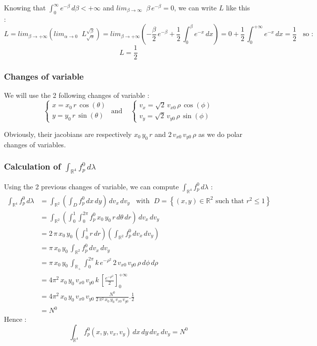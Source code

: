 \documentclass[10pt]{article}
\begin{document}
Knowing that $\int_{0}^{\infty} e^{-\beta}\,d\beta < +\infty$ and $lim_{\beta \to \infty} \;\;\beta\,e^{-\beta} = 0$, we can write $L$ like this :
$$L = lim_{\beta \to + \infty} \left(lim_{\alpha \to 0} \;\;L_{\sqrt{\alpha}}^{\sqrt{\beta}} \right)
= lim_{\beta \to + \infty} \left(-\frac{\beta}{2}\,e^{-\beta} + \frac{1}{2}\,\int_{0}^{\beta} e^{-x}\,dx \right)
= 0 +\frac{1}{2}\,\int_{0}^{+\infty} e^{-x}\,dx = \frac{1}{2} \;\; \mbox{ so :}$$
$$\boxed{L = \frac{1}{2}}$$

\subsubsection{Changes of variable}

We will use the 2 following changes of variable :
$$
\boxed{\left\lbrace
    \begin{array}{ll}
x = x_0\,r\,\cos(\theta) \\
y = y_0\,r\,\sin(\theta)
    \end{array}
\right. 
\mbox{ and } \;\;\;
\left\lbrace
    \begin{array}{ll}
v_x = \sqrt{2}\,v_{x0}\,\rho\,\cos(\phi) \\
v_y = \sqrt{2}\,v_{y0}\,\rho\,\sin(\phi)
    \end{array}
\right.
}
$$

Obviously, their jacobians are respectively $x_0\,y_0\,r$ and $2\,v_{x0}\,v_{y0}\,\rho$ as we do polar changes of variables.

\subsubsection{Calculation of $\int_{\mathbb{R}^4} f_p^0\,d\lambda$}

Using the 2 previous changes of variable, we can compute $\int_{\mathbb{R}^4} f_p^0\,d\lambda$ :
\begin{align*}
\int_{\mathbb{R}^4} f_p^0\,d\lambda &= \int_{\mathbb{R}^2} \left(\int_{D} f_p^0\,dx\,dy \right)\,dv_x\,dv_y \;\; \mbox{ with } \; D = \left\lbrace (x,y)\in\mathbb{R}^2 \mbox{ such that } r^2\leq 1 \right\rbrace \\
&= \int_{\mathbb{R}^2} \left(\int_0^1\int_0^{2\pi} f_p^0\,x_0\,y_0\,r\,d\theta\,dr \right)\,dv_x\,dv_y \\
&= 2\,\pi\,x_0\,y_0\,\left(\int_0^1 r\,dr\right) \left(
\int_{\mathbb{R}^2} f_p^0\,dv_x\,dv_y\right) \\
&= \pi\,x_0\,y_0\,
\int_{\mathbb{R}^2} f_p^0\,dv_x\,dv_y \\
&= \pi\,x_0\,y_0\,
\int_{\mathbb{R}_{+}} \int_0^{2\pi} k\,e^{-\rho^{2}}\,2\,v_{x0}\,v_{y0}\,\rho\,d\phi\,d\rho \\
&= 4\pi^{2}\,x_0\,y_0\,v_{x0}\,v_{y0}\,k\,\left[ \frac{e^{-\rho^{2}}}{2} \right]_0^{+\infty} \\
&= 4\pi^{2}\,x_0\,y_0\,v_{x0}\,v_{y0}\,\frac{N^0}{2\,\pi^{2}\,x_0\,y_0\,v_{x0}\,v_{y0}}.\frac{1}{2} \\
&=N^0
\end{align*}
Hence : 
$$\boxed{\int_{\mathbb{R}^4} f_p^0(x,y,v_x,v_y)\,dx\,dy\,dv_x\,dv_y = N^0}$$
\end{document}
